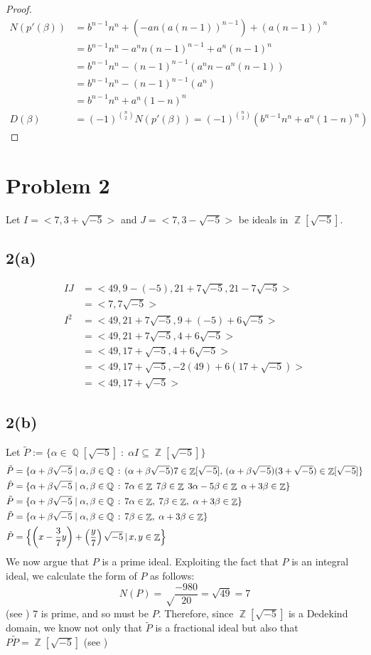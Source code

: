 \documentclass{article}
\DeclareMathOperator{\Z}{\mathbb{Z}}
\DeclareMathOperator{\Q}{\mathbb{Q}}
\begin{document}
\begin{proof}
	\begin{align*}
	N(p'(\beta)) &= b^{n-1}n^n + (-an(a(n-1))^{n-1}) + (a(n-1))^{n}\\
	&= b^{n-1}n^n - a^nn(n-1)^{n-1} + a^n(n-1)^n\\
	&= b^{n-1}n^n - (n-1)^{n-1}(a^nn-a^n(n-1))\\
	&= b^{n-1}n^n - (n-1)^{n-1}(a^n)\\
	&= b^{n-1}n^n + a^n(1-n)^n\\
	D(\beta) &= (-1)^{n\choose 2}N(p'(\beta)) = (-1)^{n\choose 2}(b^{n-1}n^n+a^n(1-n)^n)
	\end{align*}
	
\end{proof}
\newpage
\section*{Problem 2}
Let $I=<7,3+\sqrt{-5}>$ and $J=<7,3-\sqrt{-5}>$ be ideals in $\Z[\sqrt{-5}]$.
\subsection*{2(a)}
\begin{align*}
IJ &= <49, 9-(-5), 21+7\sqrt{-5}, 21-7\sqrt{-5}>\\
&= <7, 7\sqrt{-5}>\\
I^2 &= <49, 21+7\sqrt{-5}, 9+(-5)+6\sqrt{-5}>\\
&= <49, 21+7\sqrt{-5}, 4+6\sqrt{-5}>\\
&= <49,17+\sqrt{-5},4+6\sqrt{-5}>\\
&= <49,17+\sqrt{-5},-2(49)+6(17+\sqrt{-5})>\\
&= <49,17+\sqrt{-5}>
\end{align*}
\subsection*{2(b)}
Let $\tilde{P} := \{\alpha\in\Q[\sqrt{-5}]\;:\;\alpha I\subseteq \Z[\sqrt{-5}]\}$
\begin{align*}
\tilde{P} &= \{\alpha+\beta\sqrt{-5}\;|\;\alpha,\beta\in\Q\,:\,(\alpha+\beta{\sqrt{-5}})7\in\Z[\sqrt{-5}],\,(\alpha+\beta{\sqrt{-5}})(3+\sqrt{-5})\in\Z[\sqrt{-5}]\}\\
\tilde{P} &= \{\alpha+\beta\sqrt{-5}\;|\;\alpha,\beta\in\Q\,:\,7\alpha\in\Z\;7\beta\in\Z\;3\alpha-5\beta\in\Z\;\alpha+3\beta\in\Z\}\\
\tilde{P} &=
\{\alpha+\beta\sqrt{-5}\;|\;\alpha,\beta\in\Q\,:\,7\alpha\in\Z,\;7\beta\in\Z,\;\alpha+3\beta\in\Z\}\\
\tilde{P}&=
\{\alpha+\beta\sqrt{-5}\;|\;\alpha,\beta\in\Q\,:\,7\beta\in\Z,\;\alpha+3\beta\in\Z\}\\
\tilde{P}&=\Bigl\{\left(x-\frac{3}{7}y\right)+\left(\frac{y}{7}\right)\sqrt{-5}\,|\,x,y\in\Z\Bigr\}
\end{align*}
We now argue that $P$ is a prime ideal.  Exploiting the fact that $P$ is an integral ideal, we calculate the form of $P$ as follows: $$N(P) = \sqrt\frac{-980}{20} = \sqrt{49}=7$$(see \cite[9.1.1]{alacas.williamsk.s.2004}) $7$ is prime, and so must be $P$.  Therefore, since $\Z[\sqrt{-5}]$ is a Dedekind domain, we know not only that $\tilde{P}$ is a fractional ideal but also that $P\tilde{P} = \Z[\sqrt{-5}]$ (see  \cite[8.2.4]{alacas.williamsk.s.2004})
\newpage
\end{document}

